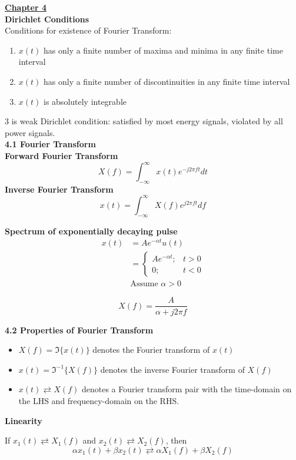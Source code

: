 \documentclass[landscape,a4paper]{extarticle}
\begin{document}
\begin{multicols*}{5}
    \textbf{\uline{Chapter 4}}\\
    \textbf{Dirichlet Conditions}\\
    Conditions for existence of Fourier Transform:
    \begin{enumerate}
        \item $x(t)$ has only a finite number of maxima and minima in any finite time interval
        \item $x(t)$ has only a finite number of discontinuities in any finite time interval
        \item $x(t)$ is absolutely integrable
    \end{enumerate}
    3 is weak Dirichlet condition: satisfied by most energy signals, violated by all power signals.\\
    \textbf{4.1 Fourier Transform}\\
    \textbf{Forward Fourier Transform}
    \[
        X(f)=\int_{-\infty}^{\infty}x(t)e^{-j2\pi ft}dt \tag{4.1a}
    \]
    \textbf{Inverse Fourier Transform}
    \[
       x(t)=\int_{-\infty}^{\infty}X(f)e^{j2\pi ft}df \tag{4.1b} 
    \]

    \textbf{Spectrum of exponentially decaying pulse}
    \begin{align*}
        x(t) &= Ae^{-\alpha t} u(t)\\
        & = \begin{cases}
            Ae^{-\alpha t}; &t > 0\\
            0; &t < 0
        \end{cases}\\
        &\text{Assume } \alpha > 0
    \end{align*}

    \[
        X(f) = \frac{A}{\alpha + j 2\pi f}
    \]

    \textbf{4.2 Properties of Fourier Transform}
    \begin{itemize}
        \item $X(f)=\Im\{x(t)\}$ denotes the Fourier transform of $x(t)$
        \item $x(t)={\Im}^{-1}\{X(f)\}$ denotes the inverse Fourier transform of $X(f)$
        \item $x(t) \rightleftarrows X(f)$ denotes a Fourier transform pair with the time-domain on the LHS and frequency-domain on the RHS.
    \end{itemize}
    \textbf{Linearity}

    If $x_1(t) \rightleftarrows X_1(f)$ and $x_2(t) \rightleftarrows X_2(f)$, then \[
        \alpha x_1(t) + \beta x_2(t)\rightleftarrows \alpha X_1(f) + \beta X_2 (f) \tag{4.2}
    \]


\end{multicols*}
\end{document}

